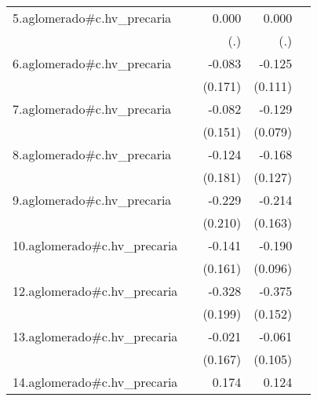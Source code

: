 {\begin{longtable}{l*{4}{D{.}{.}{-1}}}
\addlinespace
5.aglomerado#c.hv\_precaria&                     &       0.000         &       0.000         &                     \\
            &                     &         (.)         &         (.)         &                     \\
\addlinespace
6.aglomerado#c.hv\_precaria&                     &      -0.083         &      -0.125         &                     \\
            &                     &     (0.171)         &     (0.111)         &                     \\
\addlinespace
7.aglomerado#c.hv\_precaria&                     &      -0.082         &      -0.129         &                     \\
            &                     &     (0.151)         &     (0.079)         &                     \\
\addlinespace
8.aglomerado#c.hv\_precaria&                     &      -0.124         &      -0.168         &                     \\
            &                     &     (0.181)         &     (0.127)         &                     \\
\addlinespace
9.aglomerado#c.hv\_precaria&                     &      -0.229         &      -0.214         &                     \\
            &                     &     (0.210)         &     (0.163)         &                     \\
\addlinespace
10.aglomerado#c.hv\_precaria&                     &      -0.141         &      -0.190\sym{*}  &                     \\
            &                     &     (0.161)         &     (0.096)         &                     \\
\addlinespace
12.aglomerado#c.hv\_precaria&                     &      -0.328         &      -0.375\sym{*}  &                     \\
            &                     &     (0.199)         &     (0.152)         &                     \\
\addlinespace
13.aglomerado#c.hv\_precaria&                     &      -0.021         &      -0.061         &                     \\
            &                     &     (0.167)         &     (0.105)         &                     \\
\addlinespace
14.aglomerado#c.hv\_precaria&                     &       0.174         &       0.124         &                     \\

\end{longtable}}
